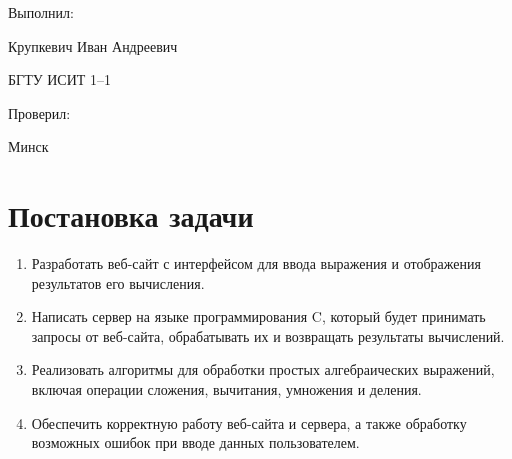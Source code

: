 \documentclass{article}
\begin{document}
\begin{titlepage}
        \begin{flushright}
            Выполнил:
            
            Крупкевич Иван Андреевич

            БГТУ ИСИТ 1--1
        \end{flushright}

        \vspace{2cm}

        \begin{flushright}
            Проверил:
            
        \end{flushright}
        
        
        \vspace{\fill}
        
        \begin{center}
            Минск \the\year
        \end{center}

    \end{titlepage}


    
    \renewcommand{\contentsname}{Содержание}
    
    \tableofcontents
    \newpage
    



    \section{Постановка задачи}

    \begin{enumerate}
        \item Разработать веб-сайт с интерфейсом для ввода выражения
        и отображения результатов его вычисления.
        
        \item Написать сервер на языке программирования C, 
        который будет принимать запросы от веб-сайта, обрабатывать 
        их и возвращать результаты вычислений.
        
        \item Реализовать алгоритмы для обработки простых алгебраических выражений, 
        включая операции сложения, вычитания, умножения и деления.
    
        \item Обеспечить корректную работу веб-сайта и сервера, 
        а также обработку возможных ошибок при вводе данных пользователем.
    \end{enumerate}
    
\end{document}
